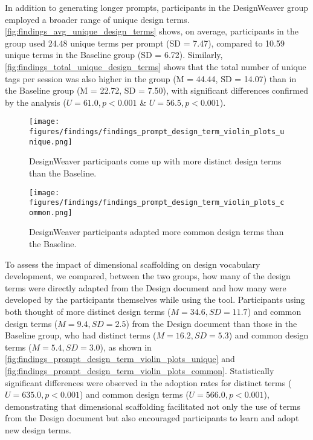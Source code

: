 In addition to generating longer prompts, participants in the DesignWeaver group employed a broader range of unique design terms. \autoref{fig:findings_avg_unique_design_terms} shows, on average, participants in the \toolname{} group used 24.48 unique terms per prompt (SD = 7.47), compared to 10.59 unique terms in the Baseline group (SD = 6.72). Similarly, \autoref{fig:findings_total_unique_design_terms} shows that the total number of unique tags per session was also higher in the \toolname{} group (M = 44.44, SD = 14.07) than in the Baseline group (M = 22.72, SD = 7.50), with significant differences confirmed by the analysis ($U = 61.0, p < 0.001$ \& $U = 56.5, p < 0.001$).

\begin{figure}[htp]
    \centering
    \texttt{[image: figures/findings/findings\_prompt\_design\_term\_violin\_plots\_unique.png]}
    \caption{DesignWeaver participants come up with more distinct design terms than the Baseline.}
    \label{fig:findings_prompt_design_term_violin_plots_unique}
\end{figure}

\begin{figure}[htp]
    \centering
    \texttt{[image: figures/findings/findings\_prompt\_design\_term\_violin\_plots\_common.png]}
    \caption{DesignWeaver participants adapted more common design terms than the Baseline.}
    \label{fig:findings_prompt_design_term_violin_plots_common}
\end{figure}

To assess the impact of dimensional scaffolding on design vocabulary development, we compared, between the two groups, how many of the design terms were directly adapted from the Design document and how many were developed by the participants themselves while using the tool. Participants using \toolname{} both thought of more distinct design terms ($M = 34.6, SD = 11.7$) and common design terms ($M = 9.4, SD = 2.5$) from the Design document than those in the Baseline group, who had distinct terms ($M = 16.2, SD = 5.3$) and common design terms ($M = 5.4, SD = 3.0$), as shown in \autoref{fig:findings_prompt_design_term_violin_plots_unique} and \autoref{fig:findings_prompt_design_term_violin_plots_common}. Statistically significant differences were observed in the adoption rates for distinct terms ($U = 635.0, p < 0.001$) and common design terms ($U = 566.0, p < 0.001$), demonstrating that dimensional scaffolding facilitated not only the use of terms from the Design document but also encouraged participants to learn and adopt new design terms.

